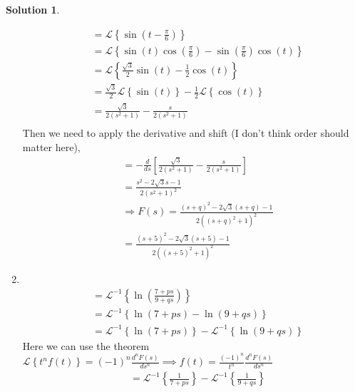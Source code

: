 \documentclass[10pt]{article}
\theoremstyle{definition}
\newtheorem{soln}{Solution}
\newcommand{\laplace}[1]{\mathcal{L}\left\{#1\right\}}
\newcommand{\laplacei}[1]{\mathcal{L}^{-1}\left\{#1\right\}}
\begin{document}
\begin{soln}
\begin{enumerate}[label=(\alph*)]
\begin{align*}
             & =\laplace{\sin\left(t-\frac{\pi}{6}\right)}                                                                  \\
             & =\laplace{\sin\left(t\right)\cos\left(\frac{\pi}{6}\right)-\sin\left(\frac{\pi}{6}\right)\cos\left(t\right)} \\
             & =\laplace{\frac{\sqrt{3}}{2}\sin\left(t\right)-\frac{1}{2}\cos\left(t\right)}                                \\
             & =\frac{\sqrt{3}}{2}\laplace{\sin\left(t\right)}-\frac{1}{2}\laplace{\cos\left(t\right)}                      \\
             & =\frac{\sqrt{3}}{2\left(s^2+1\right)}-\frac{s}{2\left(s^2+1\right)}                                          \\
          \end{align*}
          Then we need to apply the derivative and shift (I don't think order should matter here),
          \begin{align*}
             & =-\frac{d}{ds}\left[\frac{\sqrt{3}}{2\left(s^2+1\right)}-\frac{s}{2\left(s^2+1\right)}\right]                \\
             & =\frac{s^2-2\sqrt{3}s-1}{2\left(s^2+1\right)^2}                                                              \\
             & \Rightarrow F(s)=\frac{\left(s+q\right)^2-2\sqrt{3}\left(s+q\right)-1}{2\left(\left(s+q\right)^2+1\right)^2} \\
             & =\frac{\left(s+5\right)^2-2\sqrt{3}\left(s+5\right)-1}{2\left(\left(s+5\right)^2+1\right)^2}
          \end{align*}
    \item ~
          \begin{align*}
             & =\laplacei{\ln\left(\frac{7+ps}{9+qs}\right)}                    \\
             & =\laplacei{\ln\left(7+ps\right)-\ln\left(9+qs\right)}            \\
             & =\laplacei{\ln\left(7+ps\right)}-\laplacei{\ln\left(9+qs\right)}
          \end{align*}
          Here we can use the theorem $\displaystyle\laplace{t^nf(t)}=\left(-1\right)^{n}\frac{d^nF(s)}{ds^n}\implies f(t)=\frac{\left(-1\right)^{n}}{t^n}\frac{d^nF(s)}{ds^n}$
          \begin{align*}
             & =\laplacei{\frac{1}{7+ps}}-\laplacei{\frac{1}{9+qs}}                   \\

\end{align*}
\end{enumerate}
\end{soln}
\end{document}
